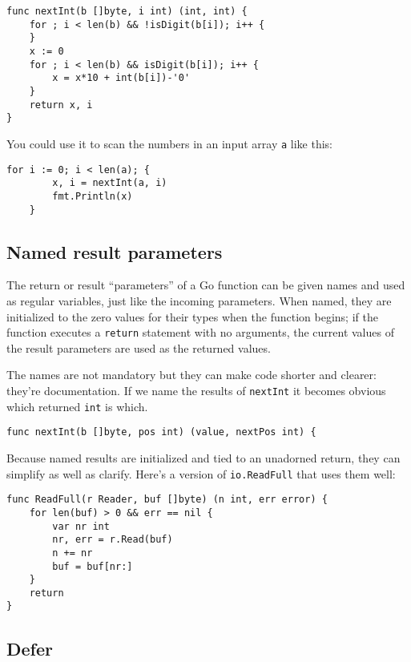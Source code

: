 \begin{Verbatim}[frame=single]
func nextInt(b []byte, i int) (int, int) {
    for ; i < len(b) && !isDigit(b[i]); i++ {
    }
    x := 0
    for ; i < len(b) && isDigit(b[i]); i++ {
        x = x*10 + int(b[i])-'0'
    }
    return x, i
}
\end{Verbatim}

You could use it to scan the numbers in an input array \texttt{a} like
this:

\begin{Verbatim}[frame=single]
    for i := 0; i < len(a); {
        x, i = nextInt(a, i)
        fmt.Println(x)
    }
\end{Verbatim}

\subsection*{Named result parameters}

The return or result ``parameters'' of a Go function can be given names
and used as regular variables, just like the incoming parameters. When
named, they are initialized to the zero values for their types when the
function begins; if the function executes a \texttt{return} statement
with no arguments, the current values of the result parameters are used
as the returned values.

The names are not mandatory but they can make code shorter and clearer:
they're documentation. If we name the results of \texttt{nextInt} it
becomes obvious which returned \texttt{int} is which.

\begin{Verbatim}[frame=single]
func nextInt(b []byte, pos int) (value, nextPos int) {
\end{Verbatim}

Because named results are initialized and tied to an unadorned return,
they can simplify as well as clarify. Here's a version of
\texttt{io.ReadFull} that uses them well:

\begin{Verbatim}[frame=single]
func ReadFull(r Reader, buf []byte) (n int, err error) {
    for len(buf) > 0 && err == nil {
        var nr int
        nr, err = r.Read(buf)
        n += nr
        buf = buf[nr:]
    }
    return
}
\end{Verbatim}

\subsection*{Defer}

